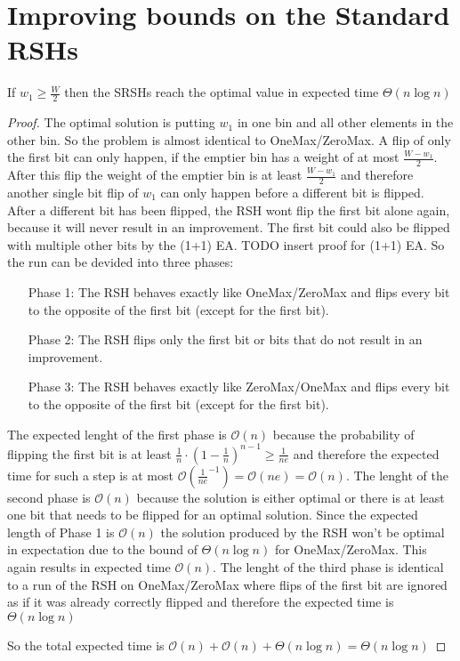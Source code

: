 \section{Improving bounds on the Standard RSHs}
\begin{lemma}\label{OneMaxResult}
    If $w_1 \ge \frac W 2$  then the SRSHs reach the optimal value in expected time $\Theta(n\log{}n)$
\end{lemma}
\begin{proof}
    The optimal solution is putting $w_1$ in one bin and all other elements in the other bin. So the problem is almost identical to OneMax/ZeroMax. A flip of only the first bit can only happen, if the emptier bin has a weight of at most $\frac {W-w_1}{2}$. After this flip the weight of the emptier bin is at least $\frac {W-w_1}{2}$ and therefore another single bit flip of $w_1$ can only happen before a different bit is flipped. After a different bit has been flipped, the RSH wont flip the first bit alone again, because it will never result in an improvement. The first bit could also be flipped with multiple other bits by the (1+1) EA. TODO insert proof for (1+1) EA. So the run can be devided into three phases:
    \begin{itemize}
        \item[Phase 1:] The RSH behaves exactly like OneMax/ZeroMax and flips every bit to the opposite of the first bit (except for the first bit).
        \item[Phase 2:] The RSH flips only the first bit or bits that do not result in an improvement.
        \item[Phase 3:] The RSH behaves exactly like ZeroMax/OneMax and flips every bit to the opposite of the first bit (except for the first bit).
    \end{itemize}

    The expected lenght of the first phase is $\mathcal{O}(n)$ because the probability of flipping the first bit is at least ${\frac{1}{n}} \cdot {(1 - \frac{1}{n})}^{n-1} \ge \frac{1}{ne}$ and therefore the expected time for such a step is at most $\mathcal{O}(\frac{1}{ne}^{-1}) = \mathcal{O}(ne) = \mathcal{O}(n)$.\newline
    The lenght of the second phase is $\mathcal{O}(n)$ because the solution is either optimal or there is at least one bit that needs to be flipped for an optimal solution. Since the expected length of Phase 1 is $\mathcal{O}(n)$ the solution produced by the RSH won't be optimal in expectation due to the bound of $\Theta(n\log{}n)$ for OneMax/ZeroMax. This again results in expected time $\mathcal{O}(n)$.\newline
    The lenght of the third phase is identical to a run of the RSH on OneMax/ZeroMax where flips of the first bit are ignored as if it was already correctly flipped and therefore the expected time is $\Theta(n\log{}n)$

    So the total expected time is $\mathcal{O}(n) + \mathcal{O}(n) + \Theta(n\log{}n) = \Theta(n\log{}n)$
\end{proof}

